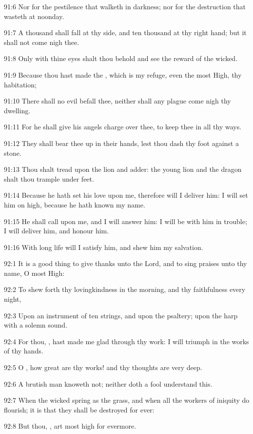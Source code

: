91:6 Nor for the pestilence that walketh in darkness; nor for the destruction that wasteth at noonday.

91:7 A thousand shall fall at thy side, and ten thousand at thy right hand; but it shall not come nigh thee.

91:8 Only with thine eyes shalt thou behold and see the reward of the wicked.

91:9 Because thou hast made the \LORD, which is my refuge, even the most High, thy habitation;

91:10 There shall no evil befall thee, neither shall any plague come nigh thy dwelling.

91:11 For he shall give his angels charge over thee, to keep thee in all thy ways.

91:12 They shall bear thee up in their hands, lest thou dash thy foot against a stone.

91:13 Thou shalt tread upon the lion and adder: the young lion and the dragon shalt thou trample under feet.

91:14 Because he hath set his love upon me, therefore will I deliver him: I will set him on high, because he hath known my name.

91:15 He shall call upon me, and I will answer him: I will be with him in trouble; I will deliver him, and honour him.

91:16 With long life will I satisfy him, and shew him my salvation.



92:1 It is a good thing to give thanks unto the Lord, and to sing praises unto thy name, O most High:

92:2 To shew forth thy lovingkindness in the morning, and thy faithfulness every night,

92:3 Upon an instrument of ten strings, and upon the psaltery; upon the harp with a solemn sound.

92:4 For thou, \LORD, hast made me glad through thy work: I will triumph in the works of thy hands.

92:5 O \LORD, how great are thy works! and thy thoughts are very deep.

92:6 A brutish man knoweth not; neither doth a fool understand this.

92:7 When the wicked spring as the grass, and when all the workers of iniquity do flourish; it is that they shall be destroyed for ever:

92:8 But thou, \LORD, art most high for evermore.

